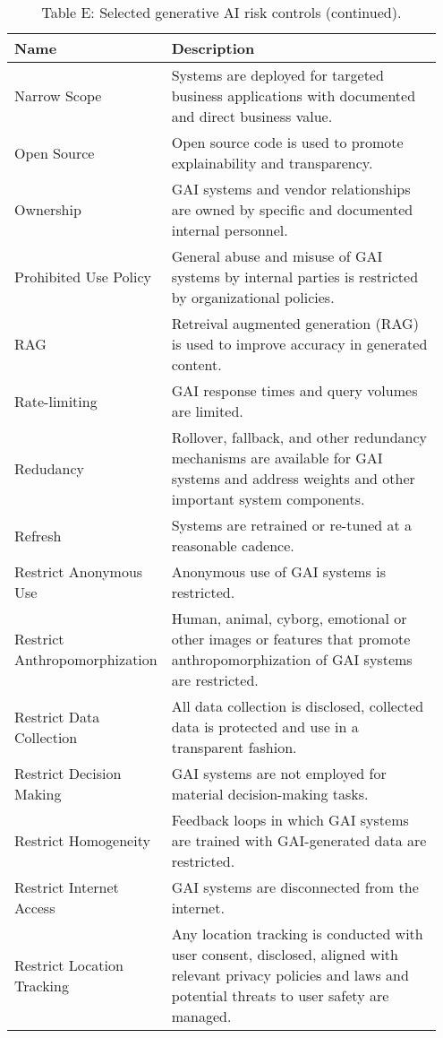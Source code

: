 \documentclass[fleqn]{article}
\begin{document}
\begin{table}[H]
	\caption*{Table E: Selected generative AI risk controls (continued).}
	\label{tab:controls_cont}
	\footnotesize
	\begin{tabular}{|m{0.25\linewidth} |m{0.70\linewidth} |}
		\hline
		\textbf{Name} & \textbf{Description} \\
		\hline		
		Narrow Scope & Systems are deployed for targeted business applications with documented and direct business value. \\ \hline
		Open Source & Open source code is used to promote explainability and transparency.  \\ \hline
		Ownership & GAI systems and vendor relationships are owned by specific and documented internal personnel. \\ \hline
		Prohibited Use Policy & General abuse and misuse of GAI systems by internal parties is restricted by organizational policies. \\ \hline
		RAG & Retreival augmented generation (RAG) is used to improve accuracy in generated content.  \\ \hline
		Rate-limiting  & GAI response times and query volumes are limited.  \\ \hline
		Redudancy & Rollover, fallback, and other redundancy mechanisms are available for GAI systems and address weights and other important system components.   \\ \hline
		Refresh & Systems are retrained or re-tuned at a reasonable cadence.  \\ \hline
		Restrict Anonymous Use & Anonymous use of GAI systems is restricted.  \\ \hline
		Restrict Anthropomorphization  & Human, animal, cyborg, emotional or other images or features that promote anthropomorphization of GAI systems are restricted.   \\ \hline
		Restrict Data Collection & All data collection is disclosed, collected data is protected and use in a transparent fashion. \\ \hline		
		Restrict Decision Making  & GAI systems are not employed for material decision-making tasks.  \\ \hline		
		Restrict Homogeneity & Feedback loops in which GAI systems are trained with GAI-generated data are restricted. \\ \hline
		Restrict Internet Access & GAI systems are disconnected from the internet.  \\ \hline		
		Restrict Location Tracking & Any location tracking is conducted with user consent, disclosed, aligned with relevant privacy policies and laws and potential threats to user safety are managed.   \\ \hline		

\end{tabular}
\end{table}
\end{document}
